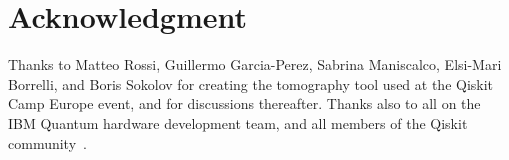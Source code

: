 \documentclass[conference]{IEEEtran}
\begin{document}
\section*{Acknowledgment}

Thanks to Matteo Rossi, Guillermo Garcia-Perez, Sabrina Maniscalco, Elsi-Mari Borrelli, and Boris Sokolov for creating the tomography tool used at the Qiskit Camp Europe event, and for discussions thereafter. Thanks also to all on the IBM Quantum hardware development team, and all members of the Qiskit community~\cite{qiskit}.



\end{document}
